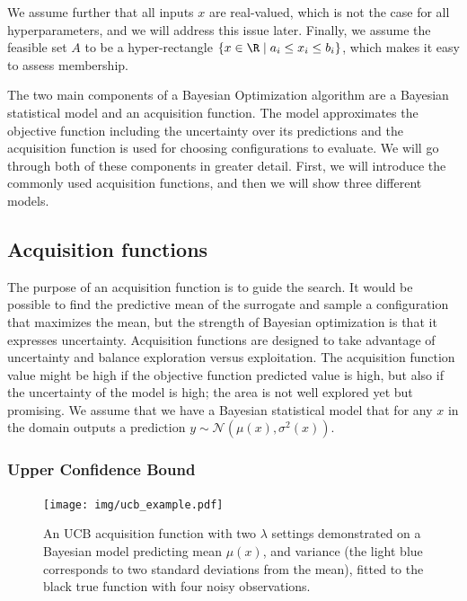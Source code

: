 
We assume further that all inputs $x$ are real-valued, which is not the case for all hyperparameters, and we will address this issue later. Finally, we assume the feasible set $A$ to be a hyper-rectangle $\{ x \in \R \mid a_i \leq x_i \leq b_i \}$, which makes it easy to assess membership.


The two main components of a Bayesian Optimization algorithm are a Bayesian statistical model and an acquisition function. The model approximates the objective function including the uncertainty over its predictions and the acquisition function is used for choosing configurations to evaluate. We will go through both of these components in greater detail. First, we will introduce the commonly used acquisition functions, and then we will show three different models.

\subsection{Acquisition functions}
The purpose of an acquisition function is to guide the search. It would be possible to find the predictive mean of the surrogate and sample a configuration that maximizes the mean, but the strength of Bayesian optimization is that it expresses uncertainty. Acquisition functions are designed to take advantage of uncertainty and balance exploration versus exploitation. The acquisition function value might be high if the objective function predicted value is high, but also if the uncertainty of the model is high; the area is not well explored yet but promising. We assume that we have a Bayesian statistical model that for any $x$ in the domain outputs a prediction $y \sim \mathcal{N}(\mu(x), \sigma^2(x))$.

\subsubsection{Upper Confidence Bound}

\begin{figure}
    \centering
    \texttt{[image: img/ucb\_example.pdf]}
    \caption{An UCB acquisition function with two $\lambda$ settings demonstrated on a Bayesian model predicting mean $\mu(x)$, and variance (the light blue corresponds to two standard deviations from the mean), fitted to the black true function with four noisy observations.}
    \label{fig:ucb}
\end{figure}


